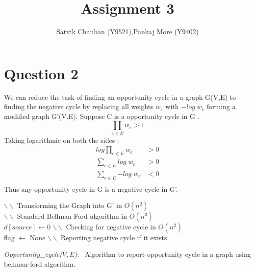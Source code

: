 \documentclass[11pt]{article}
\title{Assignment 3}
\author{Satvik Chauhan (Y9521),Pankaj More (Y9402)}
\begin{document}
\maketitle
\section*{Question 2}
We can reduce the task of finding an opportunity cycle in a graph G(V,E) to finding the negative cycle by replacing all weights $w_e$ with $-log \; w_e$
forming a modified graph G'(V,E). Suppose C is a opportunity cycle in G . 
\[ \prod_{e \in E} {w_e} > 1 \]
Taking logarithmic on both the sides :
\begin{align*}
log \prod_{e \in E} {w_e} &> 0 \\
\sum_{e \in E} {log \; w_e} &> 0 \\
\sum_{e \in E} {-log \; w_e} &< 0 \\
\end{align*}
Thus any opportunity cycle in G is a negative cycle in G'. 

\linesnumbered
\begin{algorithm}[h]
$\backslash \backslash$ Transforming the Graph into G' in $O(n^2)$ \\
$\backslash \backslash$ Standard Bellman-Ford algorithm  in $O(n^3)$ \\
$d[source]\leftarrow 0$\; 
$\backslash \backslash$ Checking for negative cycle in $O(n^2)$ \\
flag $\leftarrow$ None \;
$\backslash \backslash$ Reporting negative cycle if it exists \\
\caption{{\em Opportunity\_cycle($V,E$)}:~
Algorithm to report opportunity cycle in a graph using bellman-ford algorithm.
}
\label{Bellman-final}
\end{algorithm}
\end{document}
